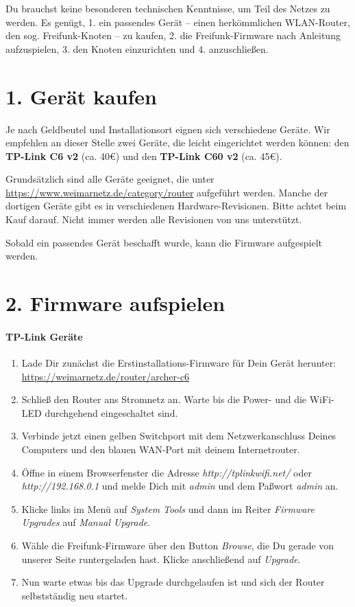 \documentclass[10pt,a4paper,notumble]{leaflet}
\begin{document}
Du brauchst keine besonderen technischen Kenntnisse, um Teil des Netzes zu werden. Es genügt, 1. ein passendes Gerät -- einen herkömmlichen WLAN-Router, den sog. Freifunk-Knoten -- zu kaufen, 2. die Freifunk-Firmware nach Anleitung aufzuspielen, 3. den Knoten einzurichten und 4. anzuschließen.


\section{1. Gerät kaufen}
Je nach Geldbeutel und Installationsort eignen sich verschiedene Geräte. Wir empfehlen an dieser Stelle zwei Geräte, die leicht eingerichtet werden können: den \textbf{TP-Link C6 v2} (ca. 40€) und den \textbf{TP-Link C60 v2} (ca. 45€).

Grundsätzlich sind alle Geräte geeignet, die unter\\\href{https://www.weimarnetz.de/category/router}{https://www.weimarnetz.de/category/router} aufgeführt werden. Manche der dortigen Geräte gibt es in verschiedenen Hardware-Revisionen. Bitte achtet beim Kauf darauf. Nicht immer werden alle Revisionen von uns unterstützt.

Sobald ein passendes Gerät beschafft wurde, kann die Firmware aufgespielt werden.

\section{2. Firmware aufspielen}

\paragraph{TP-Link Geräte}
\begin{enumerate}
 \item Lade Dir zunächst die Erstinstallations-Firmware für Dein Gerät herunter:\\\href{https://weimarnetz.de/router/archer-c6}{https://weimarnetz.de/router/archer-c6}
 \item Schließ den Router ans Stromnetz an. Warte bis die Power- und die WiFi-LED durchgehend eingeschaltet sind.
 \item Verbinde jetzt einen gelben Switchport mit dem Netzwerkanschluss Deines Computers und den blauen WAN-Port mit deinem Internetrouter.
 \item Öffne in einem Browserfenster die Adresse \textit{http://tplinkwifi.net/} oder \textit{http://192.168.0.1} und melde Dich mit \textit{admin} und dem Paßwort \textit{admin} an.
 \item Klicke links im Menü auf \textit{System Tools} und dann im Reiter \textit{Firmware Upgrades} auf \textit{Manual Upgrade}.
 \item Wähle die Freifunk-Firmware über den Button \textit{Browse}, die Du gerade von unserer Seite runtergeladen hast. Klicke anschließend auf \textit{Upgrade}.
 \item Nun warte etwas bis das Upgrade durchgelaufen ist und sich der Router selbstständig neu startet.
\end{enumerate}
\end{document}
